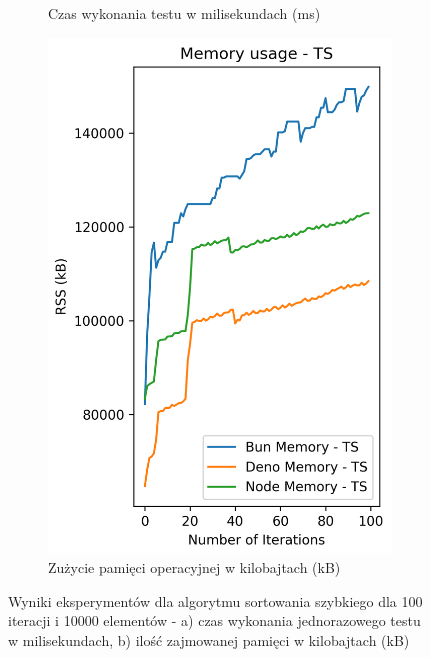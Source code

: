 \begin{figure}[H]
\begin{subfigure}[b]{0.44\textwidth}
    \caption{Czas wykonania testu w milisekundach (ms)}
    \label{fig:quick_sorting_e3_ts_time}
  \end{subfigure}
  \begin{subfigure}[b]{0.44\textwidth}
    \centering
    \includegraphics[width=\textwidth]{Figures/sorting/sorting_quick_100_10000_ts_memory.png}
    \caption{Zużycie pamięci operacyjnej w kilobajtach (kB)}
    \label{fig:quick_sorting_e3_ts_memory}
  \end{subfigure}
  \caption{Wyniki eksperymentów dla algorytmu sortowania szybkiego dla 100 iteracji i 10000 elementów - a) czas wykonania jednorazowego testu w milisekundach, b) ilość zajmowanej pamięci w kilobajtach (kB)}
  \label{fig:quick_sorting_e3_ts}
\end{figure}

